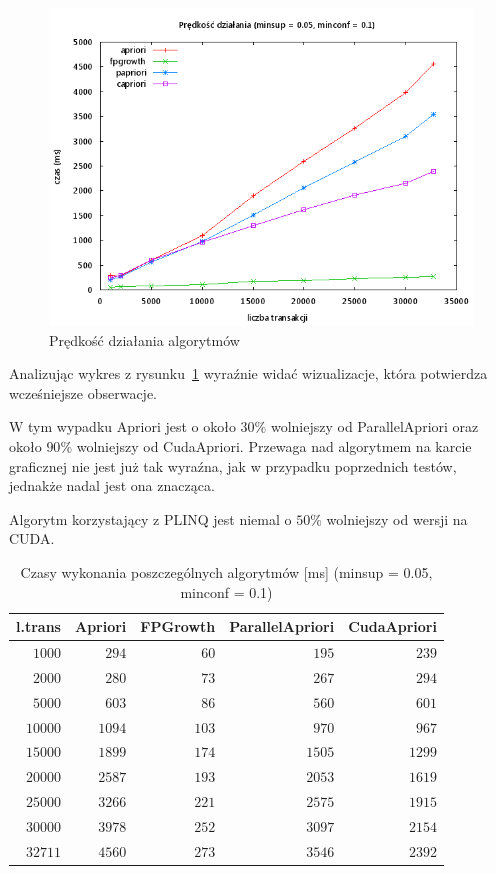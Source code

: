 \begin{figure}[H]
\centering
\includegraphics[width=1.1\textwidth]{figures/06/005_01.png}
\caption{Prędkość działania algorytmów\label{rys:005_01}}
\end{figure}

Analizując wykres z rysunku~\ref{rys:005_01} wyraźnie widać wizualizacje, która potwierdza wcześniejsze obserwacje.

W tym wypadku Apriori jest o około $30\%$ wolniejszy od ParallelApriori oraz około $90\%$ wolniejszy od CudaApriori. Przewaga nad algorytmem na karcie graficznej nie jest już tak wyraźna, jak w przypadku poprzednich testów, jednakże nadal jest ona znacząca. 

Algorytm korzystający z PLINQ jest niemal o $50\%$ wolniejszy od wersji na CUDA.

\begin{table}
	\centering
	\begin{tabular}{r|r|r|r|r}
	\textbf{l.trans} & \textbf{Apriori} & \textbf{FPGrowth} & \textbf{ParallelApriori} & \textbf{CudaApriori}  \\ \hline
	$1000$ & $294$ & $60$ & $195$ & $239$ \\
	$2000$ & $280$ & $73$ & $267$ & $294$ \\
	$5000$ & $603$ & $86$ & $560$ & $601$ \\
	$10000$ & $1094$ & $103$ & $970$ & $967$ \\
	$15000$ & $1899$ & $174$ & $1505$ & $1299$ \\
	$20000$ & $2587$ & $193$ & $2053$ & $1619$ \\
	$25000$ & $3266$ & $221$ & $2575$ & $1915$ \\
	$30000$ & $3978$ & $252$ & $3097$ & $2154$ \\
	$32711$ & $4560$ & $273$ & $3546$ & $2392$ \\
	\end{tabular}
	\caption{Czasy wykonania poszczególnych algorytmów [ms] (minsup = 0.05, minconf = 0.1)\label{tab:005_01}}
\end{table}

